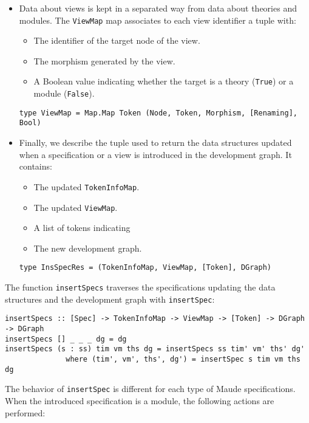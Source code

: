 \begin{itemize}
\item Data about views is kept in a separated way from data about theories
and modules. The \verb"ViewMap" map associates to each view identifier a
tuple with:

\begin{itemize}
\item The identifier of the target node of the view.
\item The morphism generated by the view.
\item A Boolean value indicating whether the target is a theory
(\verb"True") or a module (\verb"False").
\end{itemize}

{\codesize
\begin{verbatim}
type ViewMap = Map.Map Token (Node, Token, Morphism, [Renaming], Bool)
\end{verbatim}
}

\item Finally, we describe the tuple used to return the data structures
updated when a specification or a view is introduced in the development
graph. It contains:

\begin{itemize}
\item The updated \verb"TokenInfoMap".
\item The updated \verb"ViewMap".
\item A list of tokens indicating
\item The new development graph.
\end{itemize}

{\codesize
\begin{verbatim}
type InsSpecRes = (TokenInfoMap, ViewMap, [Token], DGraph)
\end{verbatim}
}

\end{itemize}

The function \verb"insertSpecs" traverses the specifications updating the
data structures and the development graph with \verb"insertSpec":

{\codesize
\begin{verbatim}
insertSpecs :: [Spec] -> TokenInfoMap -> ViewMap -> [Token] -> DGraph -> DGraph
insertSpecs [] _ _ _ dg = dg
insertSpecs (s : ss) tim vm ths dg = insertSpecs ss tim' vm' ths' dg'
              where (tim', vm', ths', dg') = insertSpec s tim vm ths dg
\end{verbatim}
}

The behavior of \verb"insertSpec" is different for each type of Maude
specifications. When the introduced specification is a module, the
following actions are performed:

